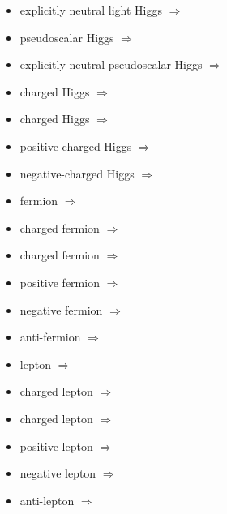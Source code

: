 \begin{multicols}{2}
{\begin{itemize}
\item explicitly neutral light Higgs\newline {} $\Rightarrow$ \Phz
\item pseudoscalar Higgs\newline {} $\Rightarrow$ \PA
\item explicitly neutral pseudoscalar Higgs\newline {} $\Rightarrow$ \PAz
\item charged Higgs\newline {} $\Rightarrow$ \PHpm
\item charged Higgs\newline {} $\Rightarrow$ \PHmp
\item positive-charged Higgs\newline {} $\Rightarrow$ \PHp
\item negative-charged Higgs\newline {} $\Rightarrow$ \PHm
\item fermion\newline {} $\Rightarrow$ \Pf
\item charged fermion\newline {} $\Rightarrow$ \Pfpm
\item charged fermion\newline {} $\Rightarrow$ \Pfmp
\item positive fermion\newline {} $\Rightarrow$ \Pfp
\item negative fermion\newline {} $\Rightarrow$ \Pfm
\item anti-fermion\newline {} $\Rightarrow$ \Paf
\item lepton\newline {} $\Rightarrow$ \Pl
\item charged lepton\newline {} $\Rightarrow$ \Plpm
\item charged lepton\newline {} $\Rightarrow$ \Plmp
\item positive lepton\newline {} $\Rightarrow$ \Plp
\item negative lepton\newline {} $\Rightarrow$ \Plm
\item anti-lepton\newline {} $\Rightarrow$ \Pal

\end{itemize}}
\end{multicols}
